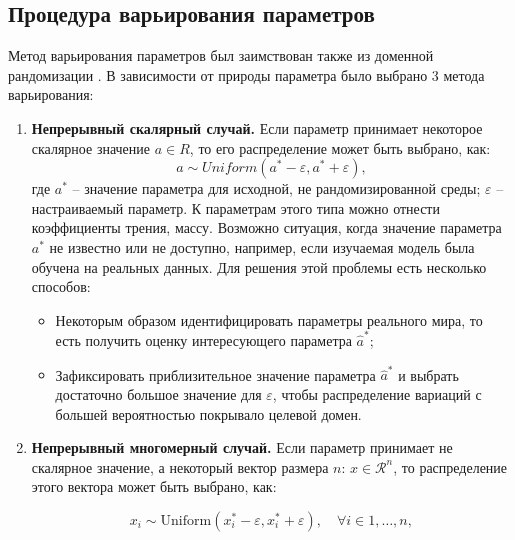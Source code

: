     \subsection{Процедура варьирования параметров}
         \label{method_randomization}
        Метод варьирования параметров был заимствован также из доменной рандомизации \cite{Peng_2018}. В зависимости от природы параметра было выбрано 3 метода варьирования:

        \begin{enumerate}
            \item \textbf{Непрерывный скалярный случай.} Если параметр принимает некоторое скалярное значение $a \in R$, то его распределение может быть выбрано, как:
            \begin{equation}
                a \sim Uniform(a^* - \varepsilon, a^* + \varepsilon),
            \end{equation}
            где $a^*$ -- значение параметра для исходной, не рандомизированной среды; $\varepsilon$ --  настраиваемый параметр. К параметрам этого типа можно отнести коэффициенты трения, массу. Возможно ситуация, когда значение параметра $a^*$ не известно или не доступно, например, если изучаемая модель была обучена на реальных данных. Для решения этой проблемы есть несколько способов:
                
                \begin{itemize}
                    \item Некоторым образом идентифицировать параметры реального мира, то есть получить оценку интересующего параметра $\hat{a}^*$;
                    \item Зафиксировать приблизительное значение параметра $\hat{a}^*$ и выбрать достаточно большое значение для $\varepsilon$, чтобы распределение вариаций с большей вероятностью покрывало целевой домен.
                \end{itemize}

            \item \textbf{Непрерывный многомерный случай.} Если параметр принимает не скалярное значение, а некоторый вектор размера $n$: $x \in \mathcal{R}^n$, то распределение этого вектора может быть выбрано, как: 

                \begin{equation}
                    x_i \sim \mathrm{Uniform}(x_i^* - \varepsilon, x_i^* + \varepsilon), \quad \forall i \in {1, \dots, n},
                \end{equation}


\end{enumerate}

